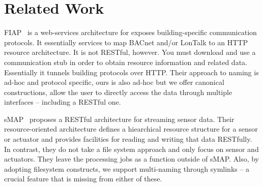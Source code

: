 \section{Related Work}

FIAP~\cite{fiap} is a web-services architecture for exposes building-specific communication protocols.  It essentially services to
map BACnet and/or LonTalk to an HTTP resource architecture.  It is not RESTful, however.  You must download and use a communication
stub in order to obtain resource information and related data.  Essentially it tunnels building protocols over HTTP.
Their approach to naming is ad-hoc and protocol specific, ours is also ad-hoc but we offer canonical constructions, allow 
the user to directly access the data through multiple interfaces -- including a RESTful one.

sMAP~\cite{smap} proposes a RESTful architecture for streaming sensor data.  Their resource-oriented architecture defines a 
hiearchical resource structure for a sensor or actuator and provides facilities for reading and writing that data RESTfully.
In contrast, they do not take a file system approach and only focus on sensor and actuators.  They leave the processing jobs
as a function outside of sMAP.  Also, by adopting filesystem constructs, we support multi-naming through symlinks -- a 
crucial feature that is missing from either of these.


